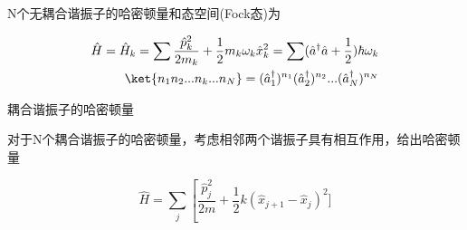 N个无耦合谐振子的哈密顿量和态空间(Fock态)为

\begin{equation}
    \begin{split}
        \hat{H} = \hat{H}_k = \sum\frac{\hat{p}^2_k}{2m_k}+\frac{1}{2}m_k\omega_k\hat{x}_k^2 = \sum(\hat{a}^\dagger\hat{a}+\frac{1}{2})\hbar\omega_k \\
        \ket{n_1n_2...n_k...n_N}=(\hat{a}_1^\dagger)^{n_1}(\hat{a}_2^\dagger)^{n_2}...(\hat{a}_N^\dagger)^{n_N}
    \end{split}
\end{equation}

耦合谐振子的哈密顿量

对于N个耦合谐振子的哈密顿量，考虑相邻两个谐振子具有相互作用，给出哈密顿量

\begin{equation}
    \hat{H} = \sum_{j}\left[\frac{\hat{p}^{2}_{j}}{2m}+\frac{1}{2}k(\hat{x}_{j+1}-\hat{x}_{j})^{2}]
\end{equation}
